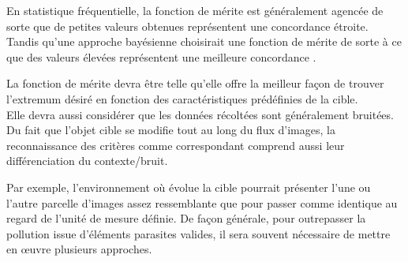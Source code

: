 \documentclass[a4paper,12pt]{report}
\begin{document}
En statistique fréquentielle, la fonction de mérite est généralement agencée de sorte que de petites valeurs obtenues représentent une concordance étroite. Tandis qu'une approche bayésienne choisirait une fonction de mérite de sorte à ce que des valeurs élevées représentent une meilleure concordance \cite{n}.

La fonction de mérite devra être telle qu'elle offre la meilleur façon de trouver l'extremum désiré en fonction des caractéristiques prédéfinies de la cible.\\

Elle devra aussi considérer que les données récoltées sont généralement bruitées.
Du fait que l'objet cible se modifie tout au long du flux d'images, la reconnaissance des critères comme correspondant comprend aussi leur différenciation du contexte/bruit. 

Par exemple, l'environnement où évolue la cible pourrait présenter l'une ou l'autre parcelle d'images assez ressemblante que pour passer comme identique au regard de l'unité de mesure définie.
De façon générale, pour outrepasser la pollution issue d'éléments parasites valides, il sera souvent nécessaire de mettre en œuvre plusieurs approches.
\end{document}
